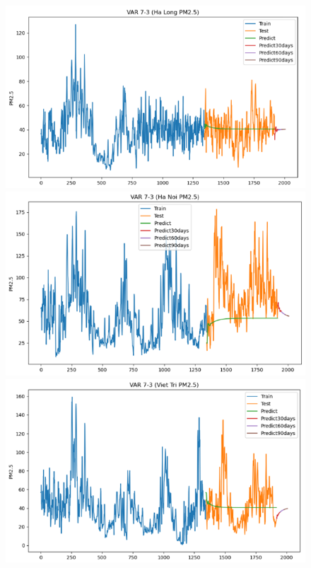 \begin{figure}[H]

    \centering
    \begin{minipage}{0.15\textwidth}
    \centering
    \end{minipage}
    \hfill

    \begin{minipage}{0.15\textwidth}
        \centering
        \includegraphics[width=1\textwidth]{img/final/VAR/90D/VAR_7_3_HL.png}
        \end{minipage}
        \hfill
        \begin{minipage}{0.15\textwidth}
        \centering
        \includegraphics[width=1\textwidth]{img/final/VAR/90D/VAR_7_3_HN.png}
        \end{minipage}
        \hfill
        \begin{minipage}{0.15\textwidth}
        \centering
        \includegraphics[width=1\textwidth]{img/final/VAR/90D/VAR_7_3_VT.png}

\end{minipage}
\end{figure}
